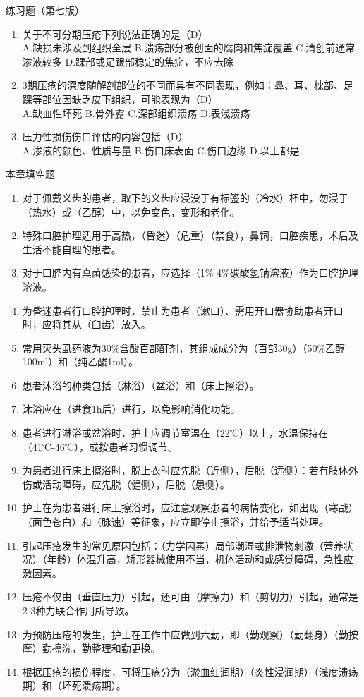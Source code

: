 \documentclass[11pt, a4paper]{ctexart}
\begin{document}
\begin{examplebox}{练习题（第七版）}
\begin{enumerate}
    \item 关于不可分期压疮下列说法正确的是（D）\\
    A.缺损未涉及到组织全层 \quad B.溃疡部分被创面的腐肉和焦痂覆盖 \quad C.清创前通常渗液较多 \quad D.踝部或足跟部稳定的焦痂，不应去除
    \item 3期压疮的深度随解剖部位的不同而具有不同表现，例如：鼻、耳、枕部、足踝等部位因缺乏皮下组织，可能表现为（D）\\
    A.缺血性坏死 \quad B.骨外露 \quad C.深部组织溃疡 \quad D.表浅溃疡
    \item 压力性损伤伤口评估的内容包括（D）\\
    A.渗液的颜色、性质与量 \quad B.伤口床表面 \quad C.伤口边缘 \quad D.以上都是
\end{enumerate}
\end{examplebox}

\begin{tipsbox}{本章填空题}
\begin{enumerate}
    \item 对于佩戴义齿的患者，取下的义齿应浸没于有标签的（冷水）杯中，勿浸于（热水）或（乙醇）中，以免变色，变形和老化。
    \item 特殊口腔护理适用于高热，（昏迷）（危重）（禁食），鼻饲，口腔疾患，术后及生活不能自理的患者。
    \item 对于口腔内有真菌感染的患者，应选择（1\%-4\%碳酸氢钠溶液）作为口腔护理溶液。
    \item 为昏迷患者行口腔护理时，禁止为患者（漱口）、需用开口器协助患者开口时，应将其从（臼齿）放入。
    \item 常用灭头虱药液为30\%含酸百部酊剂，其组成成分为（百部30g）（50\%乙醇100ml）和（纯乙酸1ml）。
    \item 患者沐浴的种类包括（淋浴）（盆浴）和（床上擦浴）。
    \item 沐浴应在（进食1h后）进行，以免影响消化功能。
    \item 患者进行淋浴或盆浴时，护士应调节室温在（22℃）以上，水温保持在（41℃-46℃），或按患者习惯调节。
    \item 为患者进行床上擦浴时，脱上衣时应先脱（近侧），后脱（远侧）：若有肢体外伤或活动障碍，应先脱（健侧），后脱（患侧）。
    \item 护士在为患者进行床上擦浴时，应注意观察患者的病情变化，如出现（寒战）（面色苍白）和（脉速）等征象，应立即停止擦浴，并给予适当处理。
    \item 引起压疮发生的常见原因包括：（力学因素）局部潮湿或排泄物刺激（营养状况）（年龄）体温升高，矫形器械使用不当，机体活动和或感觉障碍，急性应激因素。
    \item 压疮不仅由（垂直压力）引起，还可由（摩擦力）和（剪切力）引起，通常是2-3种力联合作用所导致。
    \item 为预防压疮的发生，护士在工作中应做到六勤，即（勤观察）（勤翻身）（勤按摩）勤擦洗，勤整理和勤更换。
    \item 根据压疮的损伤程度，可将压疮分为（淤血红润期）（炎性浸润期）（浅度溃疡期）和（坏死溃疡期）。
\end{enumerate}
\end{tipsbox}
\end{document}
